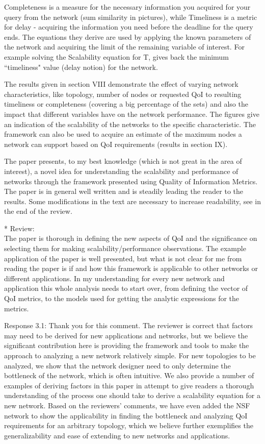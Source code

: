 \documentclass[12pt, letterpaper, onecolumn]{IEEEtran}
\begin{document}
Completeness is a measure for the necessary information you acquired for your query from the network (sum similarity in pictures), while Timeliness is a metric for delay - acquiring the information you need before the deadline for the query ends. The equations they derive are used by applying the known parameters of the network and acquiring the limit of the remaining variable of interest. For example solving the Scalability equation for T, gives back the minimum ``timeliness" value (delay notion) for the network.

The results given in section VIII demonstrate the effect of varying network characteristics, like topology, number of nodes or requested QoI to resulting timeliness or completeness (covering a big percentage of the sets) and also the impact that different variables have on the network performance. The figures give an indication of the scalability of the networks to the specific characteristic. The framework can also be used to acquire an estimate of the maximum nodes a network can support based on QoI requirements (results in section IX).

The paper presents, to my best knowledge (which is not great in the area of interest), a novel idea for understanding the scalability and performance of networks through the framework presented using Quality of Information Metrics. The paper is in general well written and is steadily leading the reader to the results. Some modifications in the text are necessary to increase readability, see in the end of the review.

\noindent** Review: \\

The paper is thorough in defining the new aspects of QoI and the significance on selecting them for making scalability/performance observations. The example application of the paper is well presented, but what is not clear for me from reading the paper is if and how this framework is applicable to other networks or different applications. In my understanding for every new network and application this whole analysis needs to start over, from defining the vector of QoI metrics, to the models used for getting the analytic expressions for the metrics.

{\color{blue}
Response 3.1: Thank you for this comment. The reviewer is correct that factors may need to be derived for new applications and networks, but we believe the significant contribution here is providing the framework and tools to make the approach to analyzing a new network relatively simple. For new topologies to be analyzed, we show that the network designer need to only determine the bottleneck of the network, which is often intuitive. We also provide a number of examples of deriving factors in this paper in attempt to give readers a thorough understanding of the process one should take to derive a scalability equation for a new network. Based on the reviewers' comments, we have even added the NSF network to show the applicability in finding the bottleneck and analyzing QoI requirements for an arbitrary topology, which we believe further exemplifies the generalizability and ease of extending to new networks and applications. 
}
\end{document}

